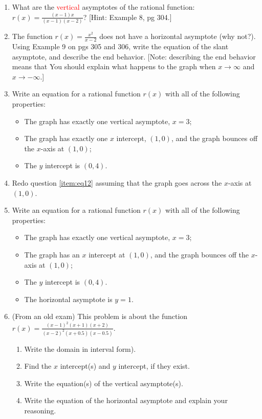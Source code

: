 \documentclass[12pt,dvipsnames]{article}
\begin{document}
\begin{enumerate}[label=\arabic*., leftmargin=2\parindent,
labelindent=\parindent, labelsep=*]
\item What are the {\textcolor{red}{vertical}} asymptotes of the rational function: $\displaystyle r(x)=\frac{(x-1)x}{(x-1)(x-2)}$? [Hint: Example 8, pg 304.]

\item The function $\displaystyle r(x)=\frac{x^2}{x-2}$ does not have a horizontal asymptote (why not?).  Using Example 9 on pgs 305 and 306, write the equation of the slant asymptote, and describe the end behavior. [Note: describing the end behavior means that You should explain what happens to the graph when $x\to \infty$ and $x\to-\infty$.]
\item \label{item:eq12} Write an equation for a rational function $r(x)$ with all of the following properties:
\begin{itemize}
	\item The graph has exactly one vertical asymptote, $x=3$;
	\item The graph has exactly one $x$ intercept, $(1,0)$, and the graph bounces off the $x$-axis at $(1,0)$;
	\item The $y$ intercept is $(0,4)$.
\end{itemize}
\item Redo question \ref{item:eq12} assuming that the graph goes across the $x$-axis at $(1,0)$.
\item Write an equation for a rational function $r(x)$ with all of the following properties:
\begin{itemize}
	\item The graph has exactly one vertical asymptote, $x=3$;
	\item The graph has an $x$ intercept at $(1,0)$, and the graph bounces off the $x$-axis at $(1,0)$;
	\item The $y$ intercept is $(0,4)$.
	\item The horizontal asymptote is $y=1$.
\end{itemize}
\item (From an old exam) This problem is about the function $\displaystyle r(x)=\frac{(x-1)^2(x+1)(x+2)}{(x-2)^2(x+0.5)(x-0.5)}$.
\begin{enumerate}
	\item Write the domain in interval form).
	\item Find the $x$ intercept(s) and $y$ intercept, if they exist.
	\item 	Write the equation(s) of  the vertical asymptote(s). 
	\item Write the equation of the horizontal asymptote and explain your reasoning.

\end{enumerate}
\end{enumerate}
\end{document}
